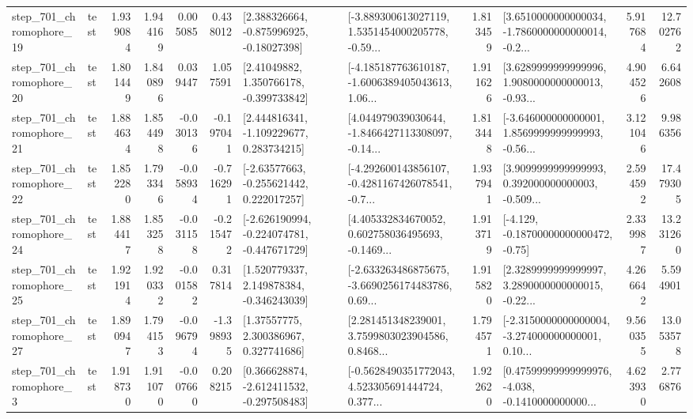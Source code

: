 \begin{tabular}{llrrrrllrlrr}
  step\_701\_chromophore\_19 &      test &      1.939084 &    1.944169 &      0.005085 &  0.438012 &    [2.388326664, -0.875996925, -0.18027398] &  [-3.889300613027119, 1.5351454000205778, -0.59... &       1.813459 &  [3.6510000000000034, -1.7860000000000014, -0.2... &            5.917684 &         12.702762 \\
  step\_701\_chromophore\_20 &      test &      1.801449 &    1.840896 &      0.039447 &  1.057591 &     [2.41049882, 1.350766178, -0.399733842] &  [-4.185187763610187, -1.6006389405043613, 1.06... &       1.911626 &  [3.6289999999999996, 1.9080000000000013, -0.93... &            4.904526 &          6.642608 \\
  step\_701\_chromophore\_21 &      test &      1.884634 &    1.854498 &     -0.030136 & -0.197041 &    [2.444816341, -1.109229677, 0.283734215] &  [4.044979039030644, -1.8466427113308097, -0.14... &       1.813448 &  [-3.646000000000001, 1.8569999999999993, -0.56... &            3.121046 &          9.986356 \\
  step\_701\_chromophore\_22 &      test &      1.852280 &    1.793346 &     -0.058934 & -0.716291 &    [-2.63577663, -0.255621442, 0.222017257] &  [-4.292600143856107, -0.4281167426078541, -0.7... &       1.937941 &  [3.9099999999999993, 0.392000000000003, -0.509... &            2.594592 &         17.479305 \\
  step\_701\_chromophore\_24 &      test &      1.884417 &    1.853258 &     -0.031158 & -0.215472 &  [-2.626190994, -0.224074781, -0.447671729] &  [4.405332834670052, 0.602758036495693, -0.1469... &       1.913719 &              [-4.129, -0.18700000000000472, -0.75] &            2.339987 &         13.231260 \\
  step\_701\_chromophore\_25 &      test &      1.921914 &    1.920332 &     -0.001582 &  0.317814 &    [1.520779337, 2.149878384, -0.346243039] &  [-2.633263486875675, -3.6690256174483786, 0.69... &       1.915820 &  [2.3289999999999997, 3.2890000000000015, -0.22... &            4.266642 &          5.594901 \\
  step\_701\_chromophore\_27 &      test &      1.890947 &    1.794153 &     -0.096794 & -1.398935 &      [1.37557775, 2.300386967, 0.327741686] &  [2.281451348239001, 3.7599803023904586, 0.8468... &       1.794571 &  [-2.3150000000000004, -3.274000000000001, 0.10... &            9.560355 &         13.053578 \\
   step\_701\_chromophore\_3 &      test &      1.918730 &    1.911070 &     -0.007660 &  0.208215 &   [0.366628874, -2.612411532, -0.297508483] &  [-0.5628490351772043, 4.523305691444724, 0.377... &       1.922620 &  [0.47599999999999976, -4.038, -0.1410000000000... &            4.623930 &          2.776876 \\

\end{tabular}
